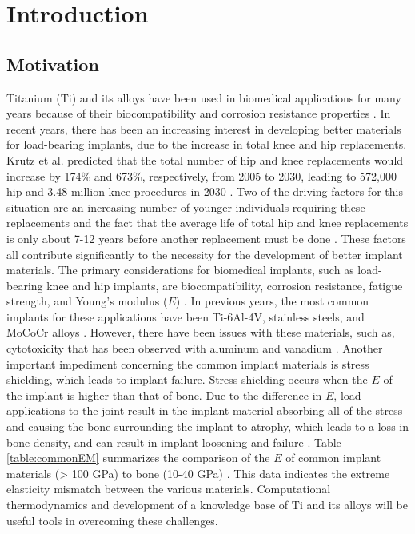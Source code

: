 \chapter{Introduction} \label{chapter1:introduction}

\section{\sloppy Motivation}
Titanium (Ti) and its alloys have been used in biomedical applications for many years because of their biocompatibility and corrosion resistance properties \cite{Long1998a}. In recent years, there has been an increasing interest in developing better materials for load-bearing implants, due to the increase in total knee and hip replacements. Krutz et al. predicted that the total number of hip and knee replacements would increase by 174\% and 673\%, respectively, from 2005 to 2030, leading to 572,000 hip and 3.48 million knee procedures in 2030 \cite{Kurtz2007}. Two of the driving factors for this situation are an increasing number of younger individuals requiring these replacements and the fact that the average life of total hip and knee replacements is only about 7-12 years before another replacement must be done \cite{Krishna2007a}. These factors all contribute significantly to the necessity for the development of better implant materials. The primary considerations for biomedical implants, such as load-bearing knee and hip implants, are biocompatibility, corrosion resistance, fatigue strength, and Young's modulus ($E$) \cite{Long1998a}. In previous years, the most common implants for these applications have been Ti-6Al-4V, stainless steels, and MoCoCr alloys \cite{Niinomi2003,Niinomi2012}. However, there have been issues with these materials, such as, cytotoxicity that has been observed with aluminum and vanadium \cite{Ito1995a}. Another important impediment concerning the common implant materials is stress shielding, which leads to implant failure. Stress shielding occurs when the $E$ of the implant is higher than that of bone. Due to the difference in $E$, load applications to the joint result in the implant material absorbing all of the stress and causing the bone surrounding the implant to atrophy, which leads to a loss in bone density, and can result in implant loosening and failure \cite{Long1998a}.  Table \ref{table:commonEM} summarizes the comparison of the $E$ of common implant materials (> 100 GPa) to bone (10-40 GPa) \cite{Long1998a}. This data indicates the extreme elasticity mismatch between the various materials. Computational thermodynamics and development of a knowledge base of Ti and its alloys will be useful tools in overcoming these challenges.

